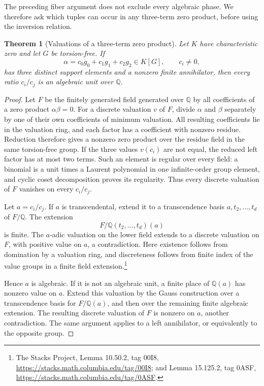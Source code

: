 \documentclass[11pt,a4paper,oneside]{report}
\newtheorem{theorem}{Theorem}[section]
\theoremstyle{definition}
\theoremstyle{remark}
\begin{document}
The preceding fiber argument does not exclude every algebraic phase.
We therefore ask which tuples can occur in any three-term zero
product, before using the inversion relation.

\begin{theorem}[Valuations of a three-term zero product]
\label{M12:ten:fixed-units}
Let $K$ have characteristic zero and let $G$ be torsion-free. If
\[
\alpha=c_0g_0+c_1g_1+c_2g_2\in K[G],
\qquad c_i\ne0,
\]
has three distinct support elements and a nonzero finite
annihilator, then every ratio $c_i/c_j$ is an algebraic unit over
$\mathbb Q$.
\end{theorem}
\begin{proof}
Let $F$ be the finitely generated field generated over $\mathbb Q$
by all coefficients of a zero product $\alpha\beta=0$.
For a discrete valuation $v$ of $F$, divide $\alpha$ and $\beta$
separately by one of their own coefficients of minimum valuation.
All resulting coefficients lie in the valuation ring, and each
factor has a coefficient with nonzero residue. Reduction therefore
gives a nonzero zero product over the residue field in the same
torsion-free group. If the three values $v(c_i)$ are not equal,
the reduced left factor has at most two terms. Such an element is
regular over every field: a binomial is a unit times a Laurent
polynomial in one infinite-order group element, and cyclic coset
decomposition proves its regularity. Thus every discrete valuation
of $F$ vanishes on every $c_i/c_j$.

Let $a=c_i/c_j$. If $a$ is transcendental, extend it to a
transcendence basis $a,t_2,\ldots,t_d$ of $F/\mathbb Q$.
The extension
\[
F/\mathbb Q(t_2,\ldots,t_d)(a)
\]
is finite. The $a$-adic valuation on the lower field extends to a
discrete valuation on $F$, with positive value on $a$, a
contradiction. Here existence follows from domination by a
valuation ring, and discreteness follows from finite index of the
value groups in a finite field extension.\footnote{The Stacks
Project, Lemma 10.50.2, tag 00I8,
\url{https://stacks.math.columbia.edu/tag/00I8}; and Lemma 15.125.2,
tag 0ASF, \url{https://stacks.math.columbia.edu/tag/0ASF}.}

Hence $a$ is algebraic. If it is not an algebraic unit, a finite
place of $\mathbb Q(a)$ has nonzero value on $a$. Extend this
valuation by the Gauss construction over a transcendence basis
for $F/\mathbb Q(a)$, and then over the remaining finite algebraic
extension. The resulting discrete valuation of $F$ is nonzero on
$a$, another contradiction.
The same argument applies to a left annihilator, or equivalently
to the opposite group.
\end{proof}
\end{document}

